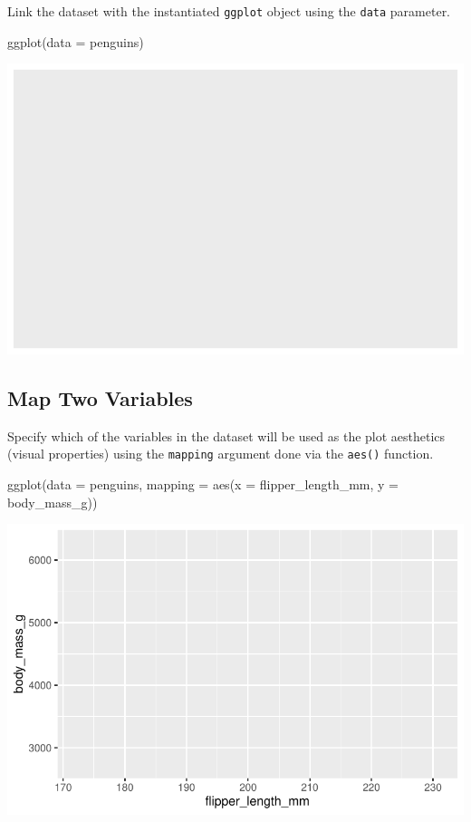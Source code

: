 \documentclass[
  letterpaper,
  DIV=11,
  numbers=noendperiod]{scrreprt}
\newenvironment{Shaded}{\begin{snugshade}}{\end{snugshade}}
\newcommand{\AttributeTok}[1]{\textcolor[rgb]{0.40,0.45,0.13}{#1}}
\newcommand{\FunctionTok}[1]{\textcolor[rgb]{0.28,0.35,0.67}{#1}}
\newcommand{\NormalTok}[1]{\textcolor[rgb]{0.00,0.23,0.31}{#1}}
\begin{document}
Link the dataset with the instantiated \texttt{ggplot} object using the
\texttt{data} parameter.

\begin{Shaded}
\begin{Highlighting}[]
\FunctionTok{ggplot}\NormalTok{(}\AttributeTok{data =}\NormalTok{ penguins)}
\end{Highlighting}
\end{Shaded}

\includegraphics{src/r-for-data-science/01-data-viz_files/figure-pdf/unnamed-chunk-8-1.pdf}

\subsection{Map Two Variables}\label{map-two-variables}

Specify which of the variables in the dataset will be used as the plot
aesthetics (visual properties) using the \texttt{mapping} argument done
via the \texttt{aes()} function.

\begin{Shaded}
\begin{Highlighting}[]
\FunctionTok{ggplot}\NormalTok{(}\AttributeTok{data =}\NormalTok{ penguins,}
       \AttributeTok{mapping =} \FunctionTok{aes}\NormalTok{(}\AttributeTok{x =}\NormalTok{ flipper\_length\_mm, }\AttributeTok{y =}\NormalTok{ body\_mass\_g))}
\end{Highlighting}
\end{Shaded}

\includegraphics{src/r-for-data-science/01-data-viz_files/figure-pdf/unnamed-chunk-9-1.pdf}
\end{document}
